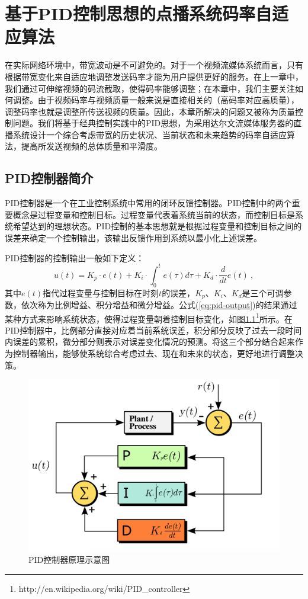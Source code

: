 \chapter{基于PID控制思想的点播系统码率自适应算法}

在实际网络环境中，带宽波动是不可避免的。对于一个视频流媒体系统而言，只有根据带宽变化来自适应地调整发送码率才能为用户提供更好的服务。在上一章中，我们通过可伸缩视频的码流截取，使得码率能够调整；在本章中，我们主要关注如何调整。由于视频码率与视频质量一般来说是直接相关的（高码率对应高质量），调整码率也就是调整所传送视频的质量。因此，本章所解决的问题又被称为质量控制问题。我们将基于经典控制实践中的PID思想，为采用达尔文流媒体服务器的直播系统设计一个综合考虑带宽的历史状况、当前状态和未来趋势的码率自适应算法，提高所发送视频的总体质量和平滑度。

\section{PID控制器简介}

PID控制器是一个在工业控制系统中常用的闭环反馈控制器。PID控制中的两个重要概念是过程变量和控制目标。过程变量代表着系统当前的状态，而控制目标是系统希望达到的理想状态。PID控制的基本思想就是根据过程变量和控制目标之间的误差来确定一个控制输出，该输出反馈作用到系统以最小化上述误差。

PID控制器的控制输出一般如下定义：
\begin{equation}
\label{eq:pid-output}
u(t) = {K_p} \cdot e(t) + {K_i} \cdot \int_0^t {e(\tau )d\tau }  + {K_d} \cdot \frac{d}{{dt}}e(t) \: ,
\end{equation}
其中$e(t)$指代过程变量与控制目标在时刻$t$的误差，$K_p$、$K_i$、$K_d$是三个可调参数，依次称为比例增益、积分增益和微分增益。公式(\ref{eq:pid-output})的结果通过某种方式来影响系统状态，使得过程变量朝着控制目标变化，如图\ref{fig:pid-controller}\footnote{http://en.wikipedia.org/wiki/PID\_controller}所示。在PID控制器中，比例部分直接对应着当前系统误差，积分部分反映了过去一段时间内误差的累积，微分部分则表示对误差变化情况的预测。将这三个部分结合起来作为控制器输出，能够使系统综合考虑过去、现在和未来的状态，更好地进行调整决策。

\begin{figure}[h]
	\centering
	\includegraphics[width = 0.7\linewidth]{figures/pid-controller.png}
	\caption{PID控制器原理示意图\label{fig:pid-controller}}
\end{figure}

